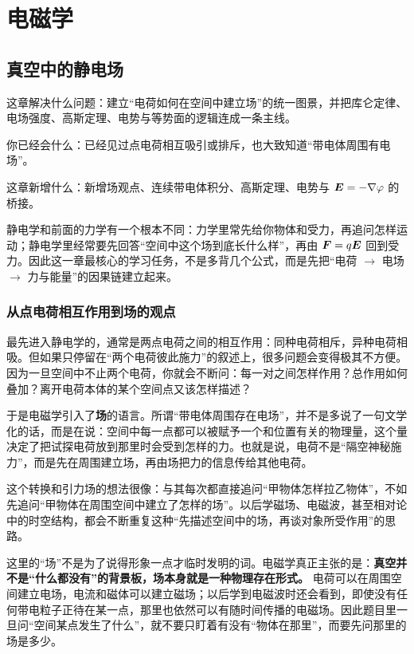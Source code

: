 \documentclass[lang=cn,11pt]{elegantbook}
\newcommand{\bridge}[1]{\begin{note}#1\end{note}}
\newcommand{\chapterroadmap}[3]{%
\begin{introduction}
  \item {\heiti 这章解决什么问题：}#1
  \item {\heiti 你已经会什么：}#2
  \item {\heiti 这章新增什么：}#3
\end{introduction}}
\begin{document}
\part{电磁学}

\chapter{真空中的静电场}

\chapterroadmap
{建立“电荷如何在空间中建立场”的统一图景，并把库仑定律、电场强度、高斯定理、电势与等势面的逻辑连成一条主线。}
{已经见过点电荷相互吸引或排斥，也大致知道“带电体周围有电场”。}
{新增场观点、连续带电体积分、高斯定理、电势与 \(\vb*{E}=-\nabla \varphi\) 的桥接。}

\bridge{静电学和前面的力学有一个根本不同：力学里常先给你物体和受力，再追问怎样运动；静电学里经常要先回答“空间中这个场到底长什么样”，再由 \(\vb*{F}=q\vb*{E}\) 回到受力。因此这一章最核心的学习任务，不是多背几个公式，而是先把“电荷 \(\rightarrow\) 电场 \(\rightarrow\) 力与能量”的因果链建立起来。}

\section{从点电荷相互作用到场的观点}

最先进入静电学的，通常是两点电荷之间的相互作用：同种电荷相斥，异种电荷相吸。但如果只停留在“两个电荷彼此施力”的叙述上，很多问题会变得极其不方便。因为一旦空间中不止两个电荷，你就会不断问：每一对之间怎样作用？总作用如何叠加？离开电荷本体的某个空间点又该怎样描述？

于是电磁学引入了\textbf{场}的语言。所谓“带电体周围存在电场”，并不是多说了一句文学化的话，而是在说：空间中每一点都可以被赋予一个和位置有关的物理量，这个量决定了把试探电荷放到那里时会受到怎样的力。也就是说，电荷不是“隔空神秘施力”，而是先在周围建立场，再由场把力的信息传给其他电荷。

\begin{remark}
这个转换和引力场的想法很像：与其每次都直接追问“甲物体怎样拉乙物体”，不如先追问“甲物体在周围空间中建立了怎样的场”。以后学磁场、电磁波，甚至相对论中的时空结构，都会不断重复这种“先描述空间中的场，再谈对象所受作用”的思路。
\end{remark}

\begin{remark}
这里的“场”不是为了说得形象一点才临时发明的词。电磁学真正主张的是：\textbf{真空并不是“什么都没有”的背景板，场本身就是一种物理存在形式。} 电荷可以在周围空间建立电场，电流和磁体可以建立磁场；以后学到电磁波时还会看到，即使没有任何带电粒子正待在某一点，那里也依然可以有随时间传播的电磁场。因此题目里一旦问“空间某点发生了什么”，就不要只盯着有没有“物体在那里”，而要先问那里的场是多少。
\end{remark}
\end{document}
